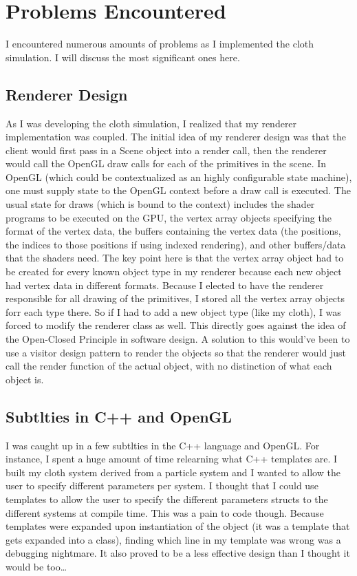\documentclass[letterpaper, 10 pt, conference]{ieeeconf}  %
\begin{document}
\section{Problems Encountered}
        I encountered numerous amounts of problems as I implemented the cloth simulation. I will discuss the most significant ones here.


\subsection{Renderer Design}
        As I was developing the cloth simulation, I realized that my renderer implementation was coupled. The initial idea of my renderer design was that the client would first pass in a Scene object into a render call, then the renderer would call the OpenGL draw calls for each of the primitives in the scene. In OpenGL (which could be contextualized as an highly configurable state machine), one must supply state to the OpenGL context before a draw call is executed. The usual state for draws (which is bound to the context) includes the shader programs to be executed on the GPU, the vertex array objects specifying the format of the vertex data, the buffers containing the vertex data (the positions, the indices to those positions if using indexed rendering), and other buffers/data that the shaders need. The key point here is that the vertex array object had to be created for every known object type in my renderer because each new object had vertex data in different formats. Because I elected to have the renderer responsible for all drawing of the primitives, I stored all the vertex array objects forr each type there. So if I had to add a new object type (like my cloth), I was forced to modify the renderer class as well. This directly goes against the idea of the Open-Closed Principle in software design. A solution to this would've been to use a visitor design pattern to render the objects so that the renderer would just call the render function of the actual object, with no distinction of what each object is. 


\subsection{Subtlties in C++ and OpenGL}
        I was caught up in a few subtlties in the C++ language and OpenGL. For instance, I spent a huge amount of time relearning what C++ templates are. I built my cloth system derived from a particle system and I wanted to allow the user to specify different parameters per system. I thought that I could use templates to allow the user to specify the different parameters structs to the different systems at compile time. This was a pain to code though. Because templates were expanded upon instantiation of the object (it was a template that gets expanded into a class), finding which line in my template was wrong was a debugging nightmare. It also proved to be a less effective design than I thought it would be too\dots
        
\end{document}
